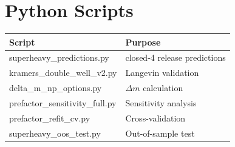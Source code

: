 \section{Python Scripts}

\begin{tabular}{ll}
\toprule
Script & Purpose \\
\midrule
superheavy\_predictions.py & closed-4 release predictions \\
kramers\_double\_well\_v2.py & Langevin validation \\
delta\_m\_np\_options.py & $\Delta m$ calculation \\
prefactor\_sensitivity\_full.py & Sensitivity analysis \\
prefactor\_refit\_cv.py & Cross-validation \\
superheavy\_oos\_test.py & Out-of-sample test \\
\bottomrule
\end{tabular}
